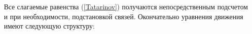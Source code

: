 Все слагаемые равенства (\ref{Tatarinov}) получаются непосредственным подсчетом и при необходимости, подстановкой связей. Окончательно уравнения движения  имеют следующую структуру:
%
%
%
%
